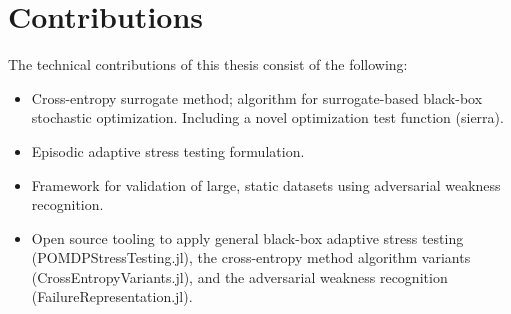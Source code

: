 

\section{Contributions} %
\label{sec:contributions}

The technical contributions of this thesis consist of the following:

\begin{itemize}
    \item Cross-entropy surrogate method; algorithm for surrogate-based black-box stochastic optimization. Including a novel optimization test function (sierra).
    \item Episodic adaptive stress testing formulation.
    \item Framework for validation of large, static datasets using adversarial weakness recognition.
    \item Open source tooling to apply general black-box adaptive stress testing (POMDPStressTesting.jl), the cross-entropy method algorithm variants (CrossEntropyVariants.jl), and the adversarial weakness recognition (FailureRepresentation.jl).
\end{itemize}








